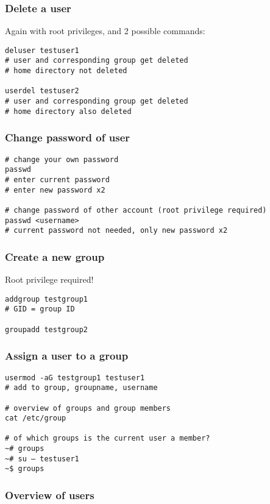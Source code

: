 \documentclass{article}
\begin{document}
\subsubsection{Delete a user}

Again with root privileges, and 2 possible commands:

\begin{verbatim}
deluser testuser1
# user and corresponding group get deleted
# home directory not deleted

userdel testuser2
# user and corresponding group get deleted
# home directory also deleted
\end{verbatim}

\subsubsection{Change password of user}

\begin{verbatim}
# change your own password
passwd
# enter current password
# enter new password x2

# change password of other account (root privilege required)
passwd <username>
# current password not needed, only new password x2
\end{verbatim}

\subsubsection{Create a new group}

Root privilege required!

\begin{verbatim}
addgroup testgroup1
# GID = group ID

groupadd testgroup2
\end{verbatim}

\subsubsection{Assign a user to a group}

\begin{verbatim}
usermod -aG testgroup1 testuser1
# add to group, groupname, username

# overview of groups and group members
cat /etc/group

# of which groups is the current user a member?
~# groups
~# su – testuser1
~$ groups
\end{verbatim}

\subsubsection{Overview of users}
\end{document}
